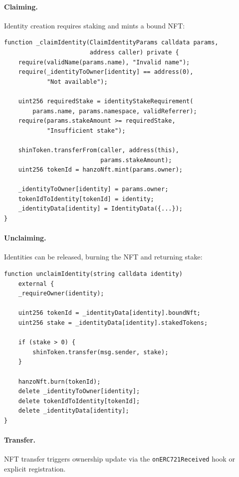 \paragraph{Claiming.} Identity creation requires staking and mints a bound NFT:

\begin{lstlisting}[language=Solidity]
function _claimIdentity(ClaimIdentityParams calldata params,
                        address caller) private {
    require(validName(params.name), "Invalid name");
    require(_identityToOwner[identity] == address(0),
            "Not available");

    uint256 requiredStake = identityStakeRequirement(
        params.name, params.namespace, validReferrer);
    require(params.stakeAmount >= requiredStake,
            "Insufficient stake");

    shinToken.transferFrom(caller, address(this),
                           params.stakeAmount);
    uint256 tokenId = hanzoNft.mint(params.owner);

    _identityToOwner[identity] = params.owner;
    tokenIdToIdentity[tokenId] = identity;
    _identityData[identity] = IdentityData({...});
}
\end{lstlisting}

\paragraph{Unclaiming.} Identities can be released, burning the NFT and returning stake:

\begin{lstlisting}[language=Solidity]
function unclaimIdentity(string calldata identity)
    external {
    _requireOwner(identity);

    uint256 tokenId = _identityData[identity].boundNft;
    uint256 stake = _identityData[identity].stakedTokens;

    if (stake > 0) {
        shinToken.transfer(msg.sender, stake);
    }

    hanzoNft.burn(tokenId);
    delete _identityToOwner[identity];
    delete tokenIdToIdentity[tokenId];
    delete _identityData[identity];
}
\end{lstlisting}

\paragraph{Transfer.} NFT transfer triggers ownership update via the \texttt{onERC721Received} hook or explicit registration.

